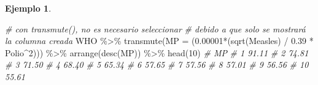 \documentclass[
]{article}
\newenvironment{Shaded}{\begin{snugshade}}{\end{snugshade}}
\newcommand{\AttributeTok}[1]{\textcolor[rgb]{0.77,0.63,0.00}{#1}}
\newcommand{\CommentTok}[1]{\textcolor[rgb]{0.56,0.35,0.01}{\textit{#1}}}
\newcommand{\DecValTok}[1]{\textcolor[rgb]{0.00,0.00,0.81}{#1}}
\newcommand{\FloatTok}[1]{\textcolor[rgb]{0.00,0.00,0.81}{#1}}
\newcommand{\FunctionTok}[1]{\textcolor[rgb]{0.00,0.00,0.00}{#1}}
\newcommand{\NormalTok}[1]{#1}
\newcommand{\SpecialCharTok}[1]{\textcolor[rgb]{0.00,0.00,0.00}{#1}}
\theoremstyle{definition}
\theoremstyle{definition}
\newtheorem{example}{Ejemplo}[section]
\theoremstyle{definition}
\theoremstyle{definition}
\theoremstyle{remark}
\begin{document}
\begin{example}
\begin{Shaded}
\begin{Highlighting}[]
\CommentTok{\# con transmute(), no es necesario seleccionar }
\CommentTok{\# debido a que solo se mostrará la columna creada}
\NormalTok{WHO }\SpecialCharTok{\%\textgreater{}\%} 
  \FunctionTok{transmute}\NormalTok{(}\AttributeTok{MP =}\NormalTok{ (}\FloatTok{0.00001}\SpecialCharTok{*}\NormalTok{(}\FunctionTok{sqrt}\NormalTok{(Measles) }\SpecialCharTok{/} \FloatTok{0.39} \SpecialCharTok{*}\NormalTok{ Polio}\SpecialCharTok{\^{}}\DecValTok{2}\NormalTok{))) }\SpecialCharTok{\%\textgreater{}\%} 
  \FunctionTok{arrange}\NormalTok{(}\FunctionTok{desc}\NormalTok{(MP)) }\SpecialCharTok{\%\textgreater{}\%} 
  \FunctionTok{head}\NormalTok{(}\DecValTok{10}\NormalTok{)}
\CommentTok{\#       MP}
\CommentTok{\# 1  91.11}
\CommentTok{\# 2  74.81}
\CommentTok{\# 3  71.50}
\CommentTok{\# 4  68.40}
\CommentTok{\# 5  65.34}
\CommentTok{\# 6  57.65}
\CommentTok{\# 7  57.56}
\CommentTok{\# 8  57.01}
\CommentTok{\# 9  56.56}
\CommentTok{\# 10 55.61}
\end{Highlighting}
\end{Shaded}

\end{example}
\end{document}
